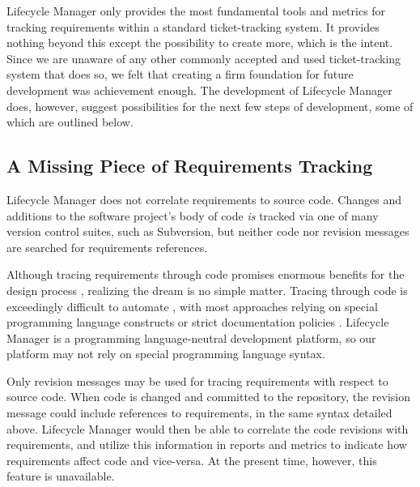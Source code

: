 \documentclass[letterpaper,10pt]{article}
\begin{document}
            Lifecycle Manager only provides the most fundamental tools and 
            metrics for tracking requirements within a standard 
            ticket-tracking system.  It provides nothing beyond this except 
            the possibility to create more, which is the intent.  Since we are 
            unaware of any other commonly accepted and used ticket-tracking 
            system that does so, we felt that creating a firm foundation for 
            future development was achievement enough. The development of 
            Lifecycle Manager does, however, suggest possibilities for the 
            next few steps of development, some of which are outlined below.

		\subsection{A Missing Piece of Requirements Tracking}

                Lifecycle Manager does not correlate requirements to
                source code. Changes and additions to the software
                project's body of code \emph{is} tracked via one of
                many version control suites, such as Subversion, but
                neither code nor revision messages are searched for
                requirements references.

                Although tracing requirements through code promises
                enormous benefits for the design process
                \cite{watkins_neal}, realizing the dream is no simple
                matter. Tracing through code is exceedingly difficult
                to automate \cite{heindl_biffl}, with most approaches
                relying on special programming language constructs or
                strict documentation policies
                \cite{ramesh_jarke}. Lifecycle Manager is a
                programming language-neutral development platform, so
                our platform may not rely on special programming
                language syntax.

                Only revision messages may be used for tracing
                requirements with respect to source code. When code is
                changed and committed to the repository, the revision
                message could include references to requirements, in the
                same syntax detailed above. Lifecycle Manager would then be 
                able to correlate the code revisions with requirements,
                and utilize this information in reports and metrics to
                indicate how requirements affect code and
                vice-versa. At the present time, however, this feature
                is unavailable.
                
\end{document}
